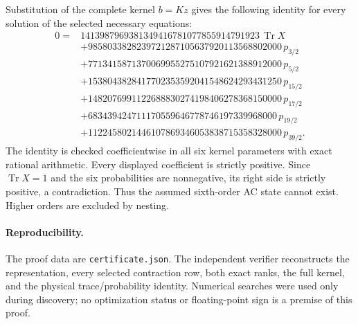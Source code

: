 \documentclass[11pt]{article}
\newcommand{\Tr}{\operatorname{Tr}}
\begin{document}
Substitution of the complete kernel $b=Kz$ gives the following identity
for every solution of the selected necessary equations:
\begin{align*}
 0={}&1413987969381349416781077855914791923\,\Tr X\\
 &+9858033828239721287105637920113568802000\,p_{3/2}\\
 &+7713415871370069955275107921621388912000\,p_{5/2}\\
 &+1538043828417702353592041548624293431250\,p_{15/2}\\
 &+1482076991122688830274198406278368150000\,p_{17/2}\\
 &+683439424711170559646778746197339968000\,p_{19/2}\\
 &+1122458021446107869346053838715358328000\,p_{39/2}.
\end{align*}
The identity is checked coefficientwise in all six kernel parameters with
exact rational arithmetic. Every displayed coefficient is strictly
positive. Since $\Tr X=1$ and the six probabilities are nonnegative, its
right side is strictly positive, a contradiction. Thus the assumed
sixth-order AC state cannot exist. Higher orders are excluded by nesting.

\paragraph{Reproducibility.}
The proof data are \texttt{certificate.json}. The independent verifier
reconstructs the representation, every selected contraction row, both
exact ranks, the full kernel, and the physical trace/probability identity.
Numerical searches were used only during discovery; no optimization
status or floating-point sign is a premise of this proof.
\end{document}
